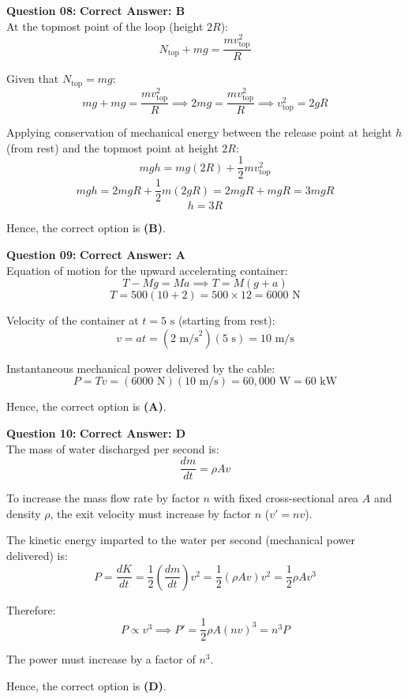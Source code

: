 \documentclass[11pt,a4paper]{article}
\begin{document}
\begin{tcolorbox}[solbox]
\textbf{\textcolor{primaryDark}{Question 08:}} \hfill \textbf{\textcolor{l1Green}{Correct Answer: B}}\\
\vspace{4pt}
At the topmost point of the loop (height $2R$):
$$N_{\text{top}} + mg = \frac{m v_{\text{top}}^2}{R}$$

Given that $N_{\text{top}} = mg$:
$$mg + mg = \frac{m v_{\text{top}}^2}{R} \implies 2mg = \frac{m v_{\text{top}}^2}{R} \implies v_{\text{top}}^2 = 2gR$$

Applying conservation of mechanical energy between the release point at height $h$ (from rest) and the topmost point at height $2R$:
$$mgh = mg(2R) + \frac{1}{2}m v_{\text{top}}^2$$
$$mgh = 2mgR + \frac{1}{2}m(2gR) = 2mgR + mgR = 3mgR$$
$$h = 3R$$

Hence, the correct option is \textbf{(B)}.
\end{tcolorbox}

\begin{tcolorbox}[solbox]
\textbf{\textcolor{primaryDark}{Question 09:}} \hfill \textbf{\textcolor{l1Green}{Correct Answer: A}}\\
\vspace{4pt}
Equation of motion for the upward accelerating container:
$$T - Mg = Ma \implies T = M(g + a)$$
$$T = 500(10 + 2) = 500 \times 12 = 6000\text{ N}$$

Velocity of the container at $t = 5\text{ s}$ (starting from rest):
$$v = at = (2\text{ m/s}^2)(5\text{ s}) = 10\text{ m/s}$$

Instantaneous mechanical power delivered by the cable:
$$P = T v = (6000\text{ N})(10\text{ m/s}) = 60,000\text{ W} = 60\text{ kW}$$

Hence, the correct option is \textbf{(A)}.
\end{tcolorbox}

\begin{tcolorbox}[solbox]
\textbf{\textcolor{primaryDark}{Question 10:}} \hfill \textbf{\textcolor{l1Green}{Correct Answer: D}}\\
\vspace{4pt}
The mass of water discharged per second is:
$$\frac{dm}{dt} = \rho A v$$

To increase the mass flow rate by factor $n$ with fixed cross-sectional area $A$ and density $\rho$, the exit velocity must increase by factor $n$ ($v' = n v$).

The kinetic energy imparted to the water per second (mechanical power delivered) is:
$$P = \frac{dK}{dt} = \frac{1}{2}\left(\frac{dm}{dt}\right)v^2 = \frac{1}{2}(\rho A v)v^2 = \frac{1}{2}\rho A v^3$$

Therefore:
$$P \propto v^3 \implies P' = \frac{1}{2}\rho A (n v)^3 = n^3 P$$

The power must increase by a factor of $n^3$.

Hence, the correct option is \textbf{(D)}.
\end{tcolorbox}
\end{document}

